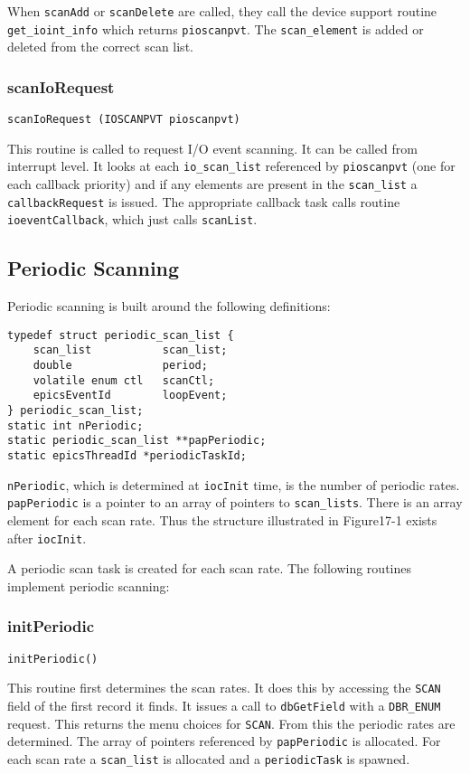 When \verb|scanAdd| or \verb|scanDelete| are called, they call the device support routine \verb|get_ioint_info| which returns 
\verb|pioscanpvt|. The \verb|scan_element| is added or deleted from the correct scan list. 

\subsubsection{scanIoRequest}

\begin{verbatim}scanIoRequest (IOSCANPVT pioscanpvt)
\end{verbatim}This routine is called to request I/O event scanning. It can be called from interrupt level. It looks at each \verb|io_scan_list| 
referenced by \verb|pioscanpvt| (one for each callback priority) and if any elements are present in the \verb|scan_list| a 
\verb|callbackRequest| is issued. The appropriate callback task calls routine \verb|ioeventCallback|, which just calls 
\verb|scanList|. 

\subsection{Periodic Scanning}

Periodic scanning is built around the following definitions:

\begin{verbatim}typedef struct periodic_scan_list {
    scan_list           scan_list;
    double              period;
    volatile enum ctl   scanCtl;
    epicsEventId        loopEvent;
} periodic_scan_list;
static int nPeriodic;
static periodic_scan_list **papPeriodic;
static epicsThreadId *periodicTaskId;
\end{verbatim}\verb|nPeriodic|, which is determined at \verb|iocInit| time, is the number of periodic rates. \verb|papPeriodic| is a pointer to an 
array of pointers to \verb|scan_lists|. There is an array element for each scan rate. Thus the structure illustrated in 
Figure17-1 exists after \verb|iocInit|.

A periodic scan task is created for each scan rate. The following routines implement periodic scanning:

\subsubsection{initPeriodic}

\begin{verbatim}initPeriodic()
\end{verbatim}This routine first determines the scan rates. It does this by accessing the \verb|SCAN| field of the first record it finds. It issues a 
call to \verb|dbGetField| with a \verb|DBR_ENUM| request. This returns the menu choices for \verb|SCAN|. From this the periodic rates are 
determined. The array of pointers referenced by \verb|papPeriodic| is allocated. For each scan rate a \verb|scan_list| is 
allocated and a \verb|periodicTask| is spawned.

